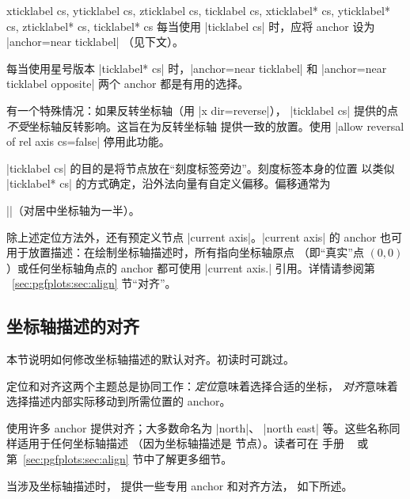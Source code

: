 \begin{coordinatesystemlist}{%
    xticklabel cs,
    yticklabel cs,
    zticklabel cs,
    ticklabel cs,
    xticklabel* cs,
    yticklabel* cs,
    zticklabel* cs,
    ticklabel* cs%
}
    每当使用 |ticklabel cs| 时，应将 anchor 设为 |anchor=near ticklabel|
    （见下文）。

    每当使用星号版本 |ticklabel* cs| 时，|anchor=near ticklabel| 和
    |anchor=near ticklabel opposite| 两个 anchor 都是有用的选择。

    有一个特殊情况：如果反转坐标轴（用 |x dir=reverse|），
    |ticklabel cs| 提供的点\emph{不受}坐标轴反转影响。这旨在为反转坐标轴
    提供一致的放置。使用 |allow reversal of rel axis cs=false| 停用此功能。

    |ticklabel cs| 的目的是将节点放在``刻度标签旁边''。刻度标签本身的位置
    以类似 |ticklabel* cs| 的方式确定，沿外法向量有自定义偏移。偏移通常为

    ||（对居中坐标轴为一半）。
\end{coordinatesystemlist}

除上述定位方法外，还有预定义节点 |current axis|。|current axis| 的
anchor 也可用于放置描述：在绘制坐标轴描述时，所有指向坐标轴原点
（即``真实''点 $(0,0)$）或任何坐标轴角点的 anchor 都可使用
|current axis.| 引用。详情请参阅第
~\ref{sec:pgfplots:sec:align} 节``对齐''。


\subsection{坐标轴描述的对齐}

本节说明如何修改坐标轴描述的默认对齐。初读时可跳过。

定位和对齐这两个主题总是协同工作：\emph{定位}意味着选择合适的坐标，
\emph{对齐}意味着选择描述内部实际移动到所需位置的 anchor。

\Tikz{} 使用许多 anchor 提供对齐；大多数命名为 |north|、
|north east| 等。这些名称同样适用于任何坐标轴描述
（因为坐标轴描述是 \Tikz{} 节点）。读者可在 \Tikz{} 手册
~\cite{tikz} 或第~\ref{sec:pgfplots:sec:align} 节中了解更多细节。

当涉及坐标轴描述时，\PGFPlots{} 提供一些专用 anchor 和对齐方法，
如下所述。

